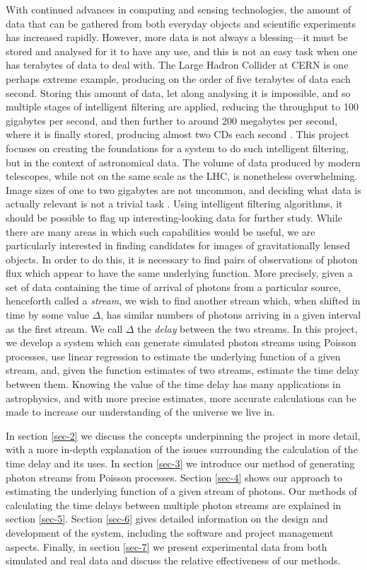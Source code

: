 \documentclass[a4paper,11pt]{article}
\begin{document}
With continued advances in computing and sensing technologies, the amount of
data that can be gathered from both everyday objects and scientific experiments
has increased rapidly. However, more data is not always a blessing---it must be
stored and analysed for it to have any use, and this is not an easy task when
one has terabytes of data to deal with. The Large Hadron Collider at CERN is one
perhaps extreme example, producing on the order of five terabytes of data each
second. Storing this amount of data, let along analysing it is impossible, and
so multiple stages of intelligent filtering are applied, reducing the throughput
to 100 gigabytes per second, and then further to around 200 megabytes per
second, where it is finally stored, producing almost two CDs each second
\cite{WLCGproc}. This project focuses on creating the foundations for a system
to do such intelligent filtering, but in the context of astronomical data. The
volume of data produced by modern telescopes, while not on the same scale as the
LHC, is nonetheless overwhelming. Image sizes of one to two gigabytes are not
uncommon, and deciding what data is actually relevant is not a trivial task
\cite{starck2002handbook}. Using intelligent filtering algorithms, it should be
possible to flag up interesting-looking data for further study. While there are
many areas in which such capabilities would be useful, we are particularly
interested in finding candidates for images of gravitationally lensed
objects. In order to do this, it is necessary to find pairs of observations of
photon flux which appear to have the same underlying function. More precisely,
given a set of data containing the time of arrival of photons from a particular
source, henceforth called a \emph{stream}, we wish to find another stream which,
when shifted in time by some value $\Delta$, has similar numbers of photons
arriving in a given interval as the first stream. We call $\Delta$ the
\emph{delay} between the two streams. In this project, we develop a system which
can generate simulated photon streams using Poisson processes, use linear
regression to estimate the underlying function of a given stream, and, given the
function estimates of two streams, estimate the time delay between them. Knowing
the value of the time delay has many applications in astrophysics, and with more
precise estimates, more accurate calculations can be made to increase our
understanding of the universe we live in.

In section \ref{sec-2} we discuss the concepts underpinning the project in more
detail, with a more in-depth explanation of the issues surrounding the
calculation of the time delay and its uses. In section \ref{sec-3} we introduce our method of generating photon streams from Poisson
processes. Section \ref{sec-4} shows our approach to estimating the
underlying function of a given stream of photons. Our methods of calculating the
time delays between multiple photon streams are explained in section \ref{sec-5}. Section \ref{sec-6} gives detailed information on the design and
development of the system, including the software and project management
aspects. Finally, in section \ref{sec-7} we present experimental data from both
simulated and real data and discuss the relative effectiveness of our methods.
\end{document}
